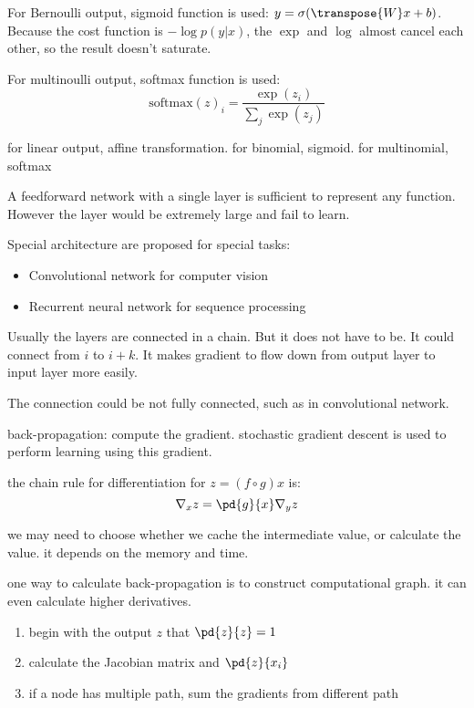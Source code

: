 For Bernoulli output, sigmoid function is used: $y = \sigma(\transpose{W}x + b)$. Because the cost function is $-\log p(y|x)$, the $\exp$ and $\log$ almost cancel each other, so the result doesn't saturate.


For multinoulli output, softmax function is used:
\begin{equation}
    \mathrm{softmax}(z)_i = \frac{\exp(z_i)}{\sum_j \exp(z_j)}
\end{equation}


for linear output, affine transformation. for binomial, sigmoid. for multinomial, softmax



\begin{theorem}
        A feedforward network with a single layer is sufficient to represent any function. However the layer would be extremely large and fail to learn. 
\end{theorem}

Special architecture are proposed for special tasks:
\begin{itemize}
    \item Convolutional network for computer vision
    \item Recurrent neural network for sequence processing
\end{itemize}

Usually the layers are connected in a chain. But it does not have to be. It could connect from $i$ to $i+k$. It makes gradient to flow down from output layer to input layer more easily.

The connection could be not fully connected, such as in convolutional network.


back-propagation: compute the gradient. stochastic gradient descent is used to perform learning using this gradient.

the chain rule for differentiation for $z = (f \circ g) x$ is:
\begin{equation}
    \nabla_x z = \pd{g}{x} \nabla_y z
\end{equation}

we may need to choose whether we cache the intermediate value, or calculate the value. it depends on the memory and time.

one way to calculate back-propagation is to construct computational graph. it can even calculate higher derivatives.
\begin{enumerate}
    \item begin with the output $z$ that $\pd{z}{z} = 1$
    \item calculate the Jacobian matrix and $\pd{z}{x_i}$
    \item if a node has multiple path, sum the gradients from different path
\end{enumerate}

